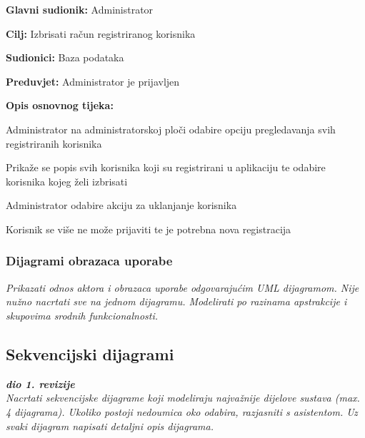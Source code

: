 \noindent {}
\begin{packed_item}
	
	\item \textbf{Glavni sudionik:} Administrator
	\item  \textbf{Cilj:} Izbrisati račun registriranog korisnika
	\item  \textbf{Sudionici:} Baza podataka
	\item  \textbf{Preduvjet:} Administrator je prijavljen
	\item  \textbf{Opis osnovnog tijeka:}
	
	\item[] \begin{packed_enum}
		
		\item Administrator na administratorskoj ploči odabire opciju pregledavanja svih registriranih korisnika 
		\item Prikaže se popis svih korisnika koji su registrirani u aplikaciju te odabire korisnika kojeg želi izbrisati
		\item Administrator odabire akciju za uklanjanje korisnika
		\item Korisnik se više ne može prijaviti te je potrebna nova registracija

	\end{packed_enum}
\end{packed_item}

\subsubsection{Dijagrami obrazaca uporabe}

\textit{Prikazati odnos aktora i obrazaca uporabe odgovarajućim UML dijagramom. Nije nužno nacrtati sve na jednom dijagramu. Modelirati po razinama apstrakcije i skupovima srodnih funkcionalnosti.}
\eject		

\subsection{Sekvencijski dijagrami}

\textbf{\textit{dio 1. revizije}}\\

\textit{Nacrtati sekvencijske dijagrame koji modeliraju najvažnije dijelove sustava (max. 4 dijagrama). Ukoliko postoji nedoumica oko odabira, razjasniti s asistentom. Uz svaki dijagram napisati detaljni opis dijagrama.}
\eject

